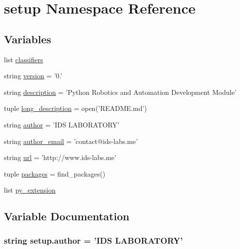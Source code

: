 \hypertarget{namespacesetup}{}\section{setup Namespace Reference}
\label{namespacesetup}
\subsection*{Variables}
\begin{DoxyCompactItemize}
\item 
list \hyperlink{namespacesetup_abe96a9c38c1c61f9f0fdb002c482f785}{classifiers}
\item 
string \hyperlink{namespacesetup_ab177531e7a80674a3db3de2d79eb8be7}{version} = '0.'
\item 
string \hyperlink{namespacesetup_ade8aa54df2083113a10326ea2fe7934b}{description} = 'Python Robotics and Automation Development Module'
\item 
tuple \hyperlink{namespacesetup_acaf26e8be236d4bfa129f4c0f4f53baf}{long\+\_\+description} = open('R\+E\+A\+D\+M\+E.\+md')
\item 
string \hyperlink{namespacesetup_ac83393287a89728d636e4ae9f4ac914f}{author} = 'I\+D\+S L\+A\+B\+O\+R\+A\+T\+O\+R\+Y'
\item 
string \hyperlink{namespacesetup_aa144ac52ed417d5c65d7377e0e75673e}{author\+\_\+email} = 'contact@ids-\/labs.\+me'
\item 
string \hyperlink{namespacesetup_a3376e8b9735800b5b9e455914cee908d}{url} = 'http\+://www.\+ids-\/labs.\+me'
\item 
tuple \hyperlink{namespacesetup_aac31bc6390743c46ed466881a9d62eb2}{packages} = find\+\_\+packages()
\item 
list \hyperlink{namespacesetup_a2816b61a4a960dcd212aa59a604e6179}{py\+\_\+extension}
\end{DoxyCompactItemize}


\subsection{Variable Documentation}
\hypertarget{namespacesetup_ac83393287a89728d636e4ae9f4ac914f}{}
\subsubsection[{author}]{\setlength{\rightskip}{0pt plus 5cm}string setup.\+author = 'I\+D\+S L\+A\+B\+O\+R\+A\+T\+O\+R\+Y'}\label{namespacesetup_ac83393287a89728d636e4ae9f4ac914f}
\hypertarget{namespacesetup_aa144ac52ed417d5c65d7377e0e75673e}{}

